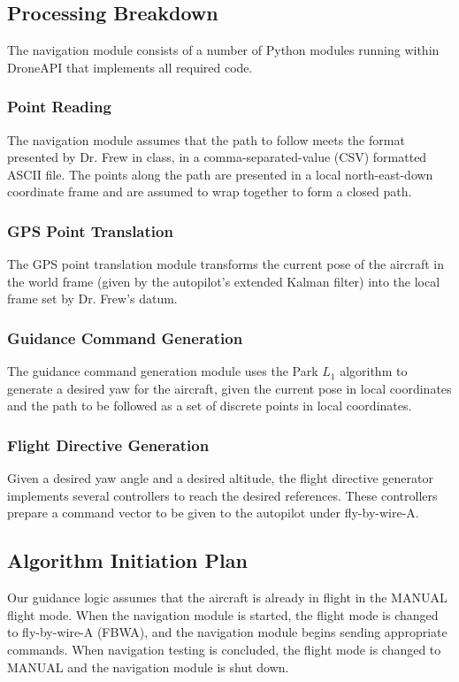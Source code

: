 \documentclass{aiaa}
\begin{document}
\subsection{Processing Breakdown}
The navigation module consists of a number of Python modules running within DroneAPI that implements all required code. 
\subsubsection{Point Reading}
The navigation module assumes that the path to follow meets the format presented by Dr. Frew in class, in a comma-separated-value (CSV) formatted ASCII file. The points along the path are presented in a local north-east-down coordinate frame and are assumed to wrap together to form a closed path. 
\subsubsection{GPS Point Translation}
The GPS point translation module transforms the current pose of the aircraft in the world frame (given by the autopilot's extended Kalman filter) into the local frame set by Dr. Frew's datum.
  
\subsubsection{Guidance Command Generation}
The guidance command generation module uses the Park $L_1$ algorithm to generate a desired yaw for the aircraft, given the current pose in local coordinates and the path to be followed as a set of discrete points in local coordinates.

\subsubsection{Flight Directive Generation}
Given a desired yaw angle and a desired altitude, the flight directive generator implements several controllers to reach the desired references. These controllers prepare a command vector to be given to the autopilot under fly-by-wire-A. 
 
\subsection{Algorithm Initiation Plan}
Our guidance logic assumes that the aircraft is already in flight in the MANUAL flight mode. When the navigation module is started, the flight mode is changed to fly-by-wire-A (FBWA), and the navigation module begins sending appropriate commands. When navigation testing is concluded, the flight mode is changed to MANUAL and the navigation module is shut down.
\end{document}
